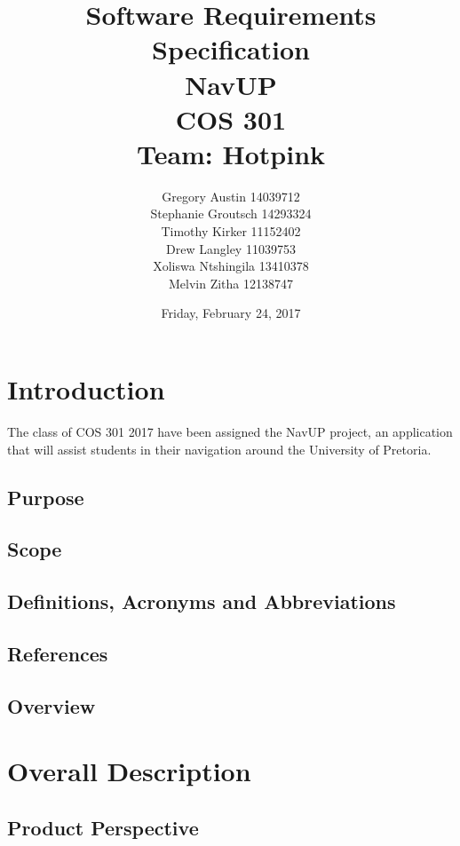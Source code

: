 \documentclass[12pt,a4paper]{report}
\title{Software Requirements Specification \\ NavUP \\ COS 301 \\ Team: Hotpink}
\date{Friday, February 24, 2017}
\author{Gregory Austin 14039712 \\ Stephanie Groutsch 14293324 \\ Timothy Kirker 11152402 \\ Drew Langley 11039753 \\ Xoliswa Ntshingila 13410378 \\ Melvin Zitha 12138747}
\begin{document}
\maketitle



\newpage
 \section*{Introduction}
The class of COS 301 2017 have been assigned the NavUP project, an application that will assist students in their navigation around the University of Pretoria.

	\subsection*{Purpose}
	
		
	\subsection*{Scope}
		
		
	\subsection*{Definitions, Acronyms and Abbreviations}
	
	\subsection*{References}
	
	
	\subsection*{Overview}
		

\newpage
\section*{Overall Description}
	\subsection*{Product Perspective}
\end{document}
